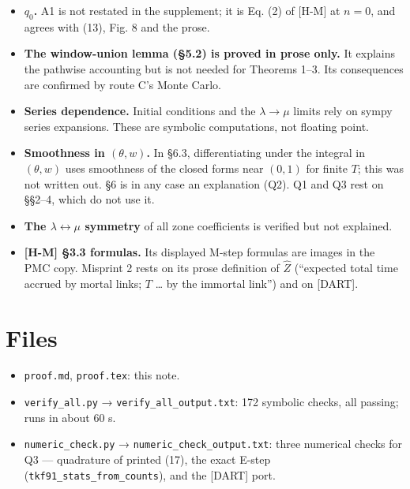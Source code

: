 \documentclass[10pt,]{article}
\providecommand{\tightlist}{%
  \setlength{\itemsep}{0pt}\setlength{\parskip}{0pt}}
\begin{document}
\begin{itemize}
\tightlist
\item
  \textbf{\(q_0\).} A1 is not restated in the supplement; it is Eq. (2)
  of {[}H-M{]} at \(n=0\), and agrees with (13), Fig. 8 and the prose.
\item
  \textbf{The window-union lemma (§5.2) is proved in prose only.} It
  explains the pathwise accounting but is not needed for Theorems 1--3.
  Its consequences are confirmed by route C's Monte Carlo.
\item
  \textbf{Series dependence.} Initial conditions and the
  \(\lambda\to\mu\) limits rely on sympy series expansions. These are
  symbolic computations, not floating point.
\item
  \textbf{Smoothness in \((\theta,w)\).} In §6.3, differentiating under
  the integral in \((\theta,w)\) uses smoothness of the closed forms
  near \((0,1)\) for finite \(T\); this was not written out. §6 is in
  any case an explanation (Q2). Q1 and Q3 rest on §§2--4, which do not
  use it.
\item
  \textbf{The \(\lambda\leftrightarrow\mu\) symmetry} of all zone
  coefficients is verified but not explained.
\item
  \textbf{{[}H-M{]} §3.3 formulas.} Its displayed M-step formulas are
  images in the PMC copy. Misprint 2 rests on its prose definition of
  \(\hat Z\) (``expected total time accrued by mortal links; \(T\)
  \ldots{} by the immortal link'') and on {[}DART{]}.
\end{itemize}

\hypertarget{files}{%
\section{Files}\label{files}}

\begin{itemize}
\tightlist
\item
  \texttt{proof.md}, \texttt{proof.tex}: this note.
\item
  \texttt{verify\_all.py} → \texttt{verify\_all\_output.txt}: 172
  symbolic checks, all passing; runs in about 60 s.
\item
  \texttt{numeric\_check.py} → \texttt{numeric\_check\_output.txt}:
  three numerical checks for Q3 --- quadrature of printed (17), the
  exact E-step (\texttt{tkf91\_stats\_from\_counts}), and the {[}DART{]}
  port.
\end{itemize}
\end{document}
